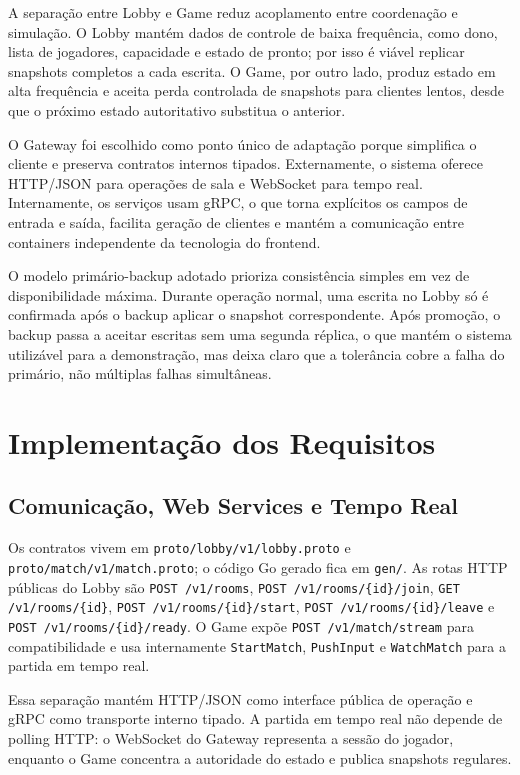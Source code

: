 \documentclass[portuguese]{sbcreviews-2025}%
\begin{document}
A separação entre Lobby e Game reduz acoplamento entre coordenação e simulação. O Lobby mantém dados de controle de baixa frequência, como dono, lista de jogadores, capacidade e estado de pronto; por isso é viável replicar snapshots completos a cada escrita. O Game, por outro lado, produz estado em alta frequência e aceita perda controlada de snapshots para clientes lentos, desde que o próximo estado autoritativo substitua o anterior.

O Gateway foi escolhido como ponto único de adaptação porque simplifica o cliente e preserva contratos internos tipados. Externamente, o sistema oferece HTTP/JSON para operações de sala e WebSocket para tempo real. Internamente, os serviços usam gRPC, o que torna explícitos os campos de entrada e saída, facilita geração de clientes e mantém a comunicação entre containers independente da tecnologia do frontend.

O modelo primário-backup adotado prioriza consistência simples em vez de disponibilidade máxima. Durante operação normal, uma escrita no Lobby só é confirmada após o backup aplicar o snapshot correspondente. Após promoção, o backup passa a aceitar escritas sem uma segunda réplica, o que mantém o sistema utilizável para a demonstração, mas deixa claro que a tolerância cobre a falha do primário, não múltiplas falhas simultâneas.

\section{Implementação dos Requisitos}

\subsection{Comunicação, Web Services e Tempo Real}

Os contratos vivem em \texttt{proto/lobby/v1/lobby.proto} e \texttt{proto/match/v1/match.proto}; o código Go gerado fica em \texttt{gen/}. As rotas HTTP públicas do Lobby são \texttt{POST /v1/rooms}, \texttt{POST /v1/rooms/\{id\}/join}, \texttt{GET /v1/rooms/\{id\}}, \texttt{POST /v1/rooms/\{id\}/start}, \texttt{POST /v1/rooms/\{id\}/leave} e \texttt{POST /v1/rooms/\{id\}/ready}. O Game expõe \texttt{POST /v1/match/stream} para compatibilidade e usa internamente \texttt{StartMatch}, \texttt{PushInput} e \texttt{WatchMatch} para a partida em tempo real.

Essa separação mantém HTTP/JSON como interface pública de operação e gRPC como transporte interno tipado. A partida em tempo real não depende de polling HTTP: o WebSocket do Gateway representa a sessão do jogador, enquanto o Game concentra a autoridade do estado e publica snapshots regulares.
\end{document}
